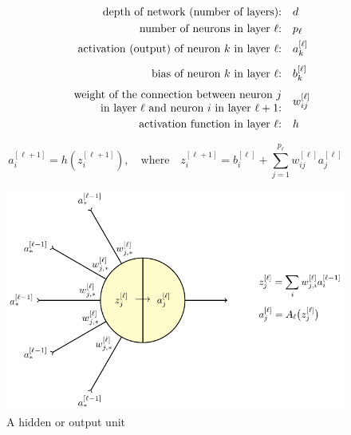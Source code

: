 \documentclass{beamer}
\begin{document}
\begin{frame}{}
    \begin{align*}
        \text{depth of network (number of layers):\quad}&d\\
        \text{number of neurons in layer $\ell$:\quad}&p_\ell\\
        \text{activation (output) of neuron $k$ in layer $\ell$:\quad}
        & a_k^{[\ell]}\\[1ex]
        \text{bias of neuron $k$ in layer $\ell$:\quad}& b_k^{[\ell]}\\[1ex]
        \text{\parbox{3in}{\raggedleft weight of the connection between neuron $j$\\
        in layer $\ell$ and neuron $i$ in layer $\ell+1$:}\quad}& w^{[\ell]}_{ij}\\
        \text{activation function in layer $\ell$:\quad}&h
    \end{align*}

    \[
        a^{[\ell+1]}_i = h\left(z_i^{[\ell+1]}\right),
        \quad\text{where}\quad
        z_i^{[\ell+1]}=b_i^{[\ell]} + \sum_{j=1}^{p_\ell} w_{ij}^{[\ell]}a_j^{[\ell]}
    \]
\end{frame}

\begin{frame}{}
    \begin{figure}
    \includegraphics[scale=0.9]{./neuron/neuron.pdf}
    \caption{A hidden or output unit}
    \end{figure}
\end{frame}
\end{document}
